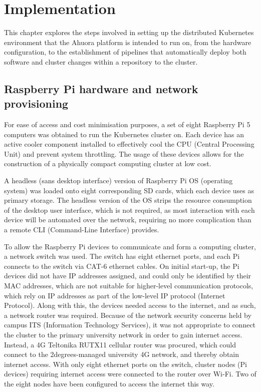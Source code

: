 \chapter{Implementation}

This chapter explores the steps involved in setting up the distributed Kubernetes environment that the Ahuora platform is intended to run on, from the hardware configuration, to the establishment of pipelines that automatically deploy both software and cluster changes within a repository to the cluster.

\section{Raspberry Pi hardware and network provisioning}

For ease of access and cost minimisation purposes, a set of eight Raspberry Pi 5 computers was obtained to run the Kubernetes cluster on. Each device has an active cooler component installed to effectively cool the CPU (Central Processing Unit) and prevent system throttling. The usage of these devices allows for the construction of a physically compact computing cluster at low cost.

A headless (sans desktop interface) version of Raspberry Pi OS (operating system) was loaded onto eight corresponding SD cards, which each device uses as primary storage. The headless version of the OS strips the resource consumption of the desktop user interface, which is not required, as most interaction with each device will be automated over the network, requiring no more complication than a remote CLI (Command-Line Interface) provides.

To allow the Raspberry Pi devices to communicate and form a computing cluster, a network switch was used. The switch has eight ethernet ports, and each Pi connects to the switch via CAT-6 ethernet cables. On initial start-up, the Pi devices did not have IP addresses assigned, and could only be identified by their MAC addresses, which are not suitable for higher-level communication protocols, which rely on IP addresses as part of the low-level IP protocol (Internet Protocol). Along with this, the devices needed access to the internet, and as such, a network router was required. Because of the network security concerns held by campus ITS (Information Technology Services), it was not appropriate to connect the cluster to the primary university network in order to gain internet access. Instead, a 4G Teltonika RUTX11 cellular router was procured, which could connect to the 2degrees-managed university 4G network, and thereby obtain internet access. With only eight ethernet ports on the switch, cluster nodes (Pi devices) requiring internet access were connected to the router over Wi-Fi. Two of the eight nodes have been configured to access the internet this way.

